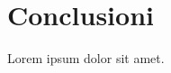 \documentclass[hidelinks, 12pt]{article}
\begin{document}
\clearpage



\section{Conclusioni}

Lorem ipsum dolor sit amet.




\newpage


	
\end{document}
